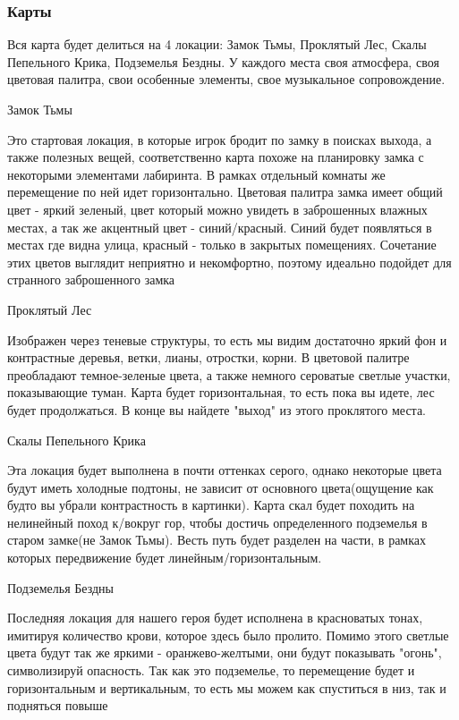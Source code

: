 \documentclass{article}
\begin{document}
\subsubsection{Карты}
Вся карта будет делиться на 4 локации: Замок Тьмы, Проклятый Лес, Скалы  Пепельного Крика, Подземелья Бездны. У каждого места своя атмосфера, своя цветовая палитра, свои особенные элементы, свое музыкальное сопровождение. \par
Замок Тьмы \par
Это стартовая локация, в которые игрок бродит по замку в поисках выхода, а также полезных вещей, соответственно карта похоже на планировку замка с некоторыми элементами лабиринта. В рамках отдельный комнаты же перемещение по ней идет горизонтально. Цветовая палитра замка имеет общий цвет - яркий зеленый, цвет который можно увидеть в заброшенных влажных местах, а так же акцентный цвет - синий/красный. Синий будет появляться в местах где видна улица, красный - только в закрытых помещениях. Сочетание этих цветов выглядит неприятно и некомфортно, поэтому идеально подойдет для странного заброшенного замка \par
Проклятый Лес \par
Изображен через теневые структуры, то есть мы видим достаточно яркий фон и контрастные деревья, ветки, лианы, отростки, корни. В цветовой палитре преобладают темное-зеленые цвета, а также немного сероватые светлые участки, показывающие туман. Карта будет горизонтальная, то есть пока вы идете, лес будет продолжаться. В конце вы найдете "выход" из этого проклятого места. \par
Скалы  Пепельного Крика \par
Эта локация будет выполнена в почти оттенках серого, однако некоторые цвета будут иметь холодные подтоны, не зависит от основного цвета(ощущение как будто вы убрали контрастность в картинки). Карта скал будет походить на нелинейный поход к/вокруг гор, чтобы достичь определенного подземелья в старом замке(не Замок Тьмы).  Весть путь будет разделен на части, в рамках которых передвижение будет линейным/горизонтальным.\par
Подземелья Бездны \par
Последняя локация для нашего героя будет исполнена в красноватых тонах, имитируя количество крови, которое здесь было пролито. Помимо этого светлые цвета будут так же яркими - оранжево-желтыми, они будут показывать "огонь", символизируй опасность. Так как это подземелье, то перемещение будет и горизонтальным и вертикальным, то есть мы можем как спуститься в низ, так и подняться повыше \par
\end{document}
